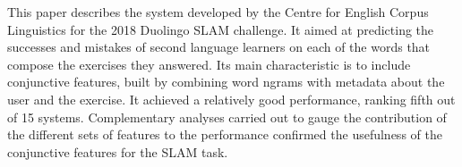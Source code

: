 This paper describes the system developed by the Centre for English Corpus Linguistics for the 2018 Duolingo SLAM challenge. It aimed at predicting the successes and mistakes of second language learners on each of the words that compose the exercises they answered. Its main characteristic is to include conjunctive features, built by combining word ngrams with metadata about the user and the exercise. It achieved a relatively good performance, ranking fifth out of 15 systems. Complementary analyses carried out to gauge the contribution of the different sets of features to the performance confirmed the usefulness of the conjunctive features for the SLAM task.

